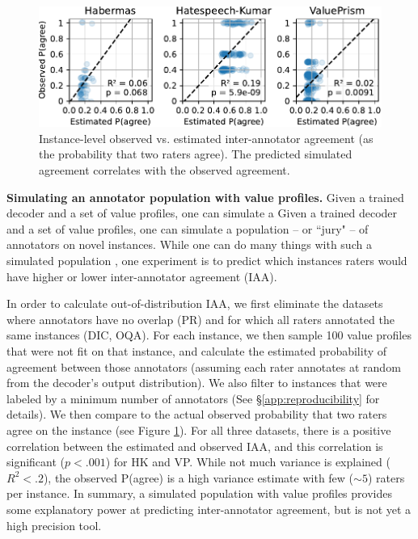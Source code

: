 \documentclass[11pt]{article}
\begin{document}
\begin{figure}
\centering
\includegraphics[width=0.8\columnwidth]{files/agreement.pdf}
\caption{Instance-level observed vs. estimated inter-annotator agreement (as the probability that two raters agree).
The predicted simulated agreement correlates with the observed agreement.
}
\label{fig:agreement}
\vspace{-10pt}
\end{figure}

\textbf{Simulating an annotator population with value profiles.}
Given a trained decoder and a set of value profiles, one can simulate a 
Given a trained decoder and a set of value profiles, one can simulate a population -- or ``jury" \citep{Gordon_2022} -- of annotators on novel instances. While one can do many things with such a simulated population \citep{park2023generativeagentsinteractivesimulacra, Gordon_2022}, one experiment is to predict which instances raters would have higher or lower inter-annotator agreement (IAA).

In order to calculate out-of-distribution IAA, we first eliminate the datasets where annotators have no overlap (PR) and for which all raters annotated the same instances (DIC, OQA). For each instance, we then sample 100 value profiles that were not fit on that instance, and calculate the estimated probability of agreement between those annotators (assuming each rater annotates at random from the decoder's output distribution). We also filter to instances that were labeled by a minimum number of annotators (See \S\ref{app:reproducibility} for details). We then compare to the actual observed probability that two raters agree on the instance (see Figure \ref{fig:agreement}). For all three datasets, there is a positive correlation between the estimated and observed IAA, and this correlation is significant ($p<.001$) for HK and VP. While not much variance is explained ($R^2 < .2$), the observed P(agree) is a high variance estimate with few ($\sim 5$) raters per instance. In summary, a simulated population with value profiles provides some explanatory power at predicting inter-annotator agreement, but is not yet a high precision tool.
\end{document}
